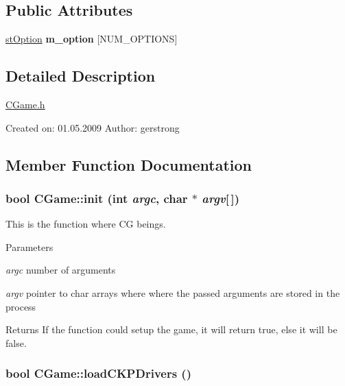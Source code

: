 \subsection*{Public Attributes}
\begin{DoxyCompactItemize}
\item 
\hypertarget{class_c_game_ae4bea6060321250358d0f1cd663aeba4}{
\hyperlink{structst_option}{stOption} {\bfseries m\_\-option} \mbox{[}NUM\_\-OPTIONS\mbox{]}}
\label{class_c_game_ae4bea6060321250358d0f1cd663aeba4}

\end{DoxyCompactItemize}


\subsection{Detailed Description}
\hyperlink{_c_game_8h_source}{CGame.h}

Created on: 01.05.2009 Author: gerstrong 

\subsection{Member Function Documentation}
\hypertarget{class_c_game_a653ccde97dffc8d499991e14d1f46e8d}{
\subsubsection[{init}]{\setlength{\rightskip}{0pt plus 5cm}bool CGame::init (int {\em argc}, \/  char $\ast$ {\em argv}\mbox{[}$\,$\mbox{]})}}
\label{class_c_game_a653ccde97dffc8d499991e14d1f46e8d}


This is the function where CG beings. 


\begin{DoxyParams}{Parameters}
\item[{\em argc}]number of arguments \item[{\em argv}]pointer to char arrays where where the passed arguments are stored in the process \end{DoxyParams}
\begin{DoxyReturn}{Returns}
If the function could setup the game, it will return true, else it will be false. 
\end{DoxyReturn}
\hypertarget{class_c_game_ab95983de4443a6c459c4fe013ec50059}{
\subsubsection[{loadCKPDrivers}]{\setlength{\rightskip}{0pt plus 5cm}bool CGame::loadCKPDrivers ()}}
\label{class_c_game_ab95983de4443a6c459c4fe013ec50059}


